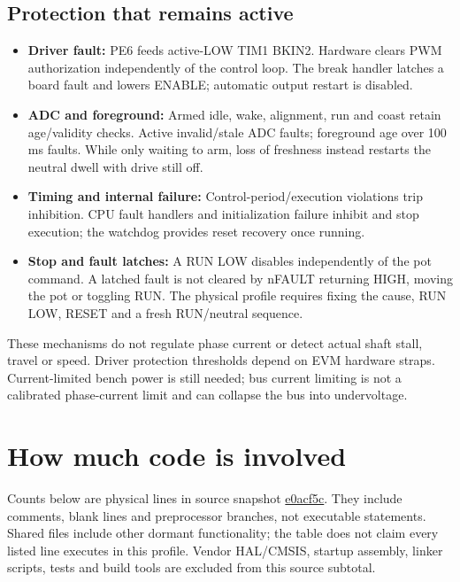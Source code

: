 \documentclass[11pt,letterpaper]{article}
\begin{document}
\subsection{Protection that remains active}

\begin{itemize}
\item \textbf{Driver fault:} PE6 feeds active-LOW TIM1 BKIN2. Hardware clears
PWM authorization independently of the control loop. The break handler latches
a board fault and lowers ENABLE; automatic output restart is disabled.
\item \textbf{ADC and foreground:} Armed idle, wake, alignment, run and coast
retain age/validity checks. Active invalid/stale ADC faults; foreground age
over 100 ms faults. While only waiting to arm, loss of freshness instead
restarts the neutral dwell with drive still off.
\item \textbf{Timing and internal failure:} Control-period/execution violations
trip inhibition. CPU fault handlers and initialization failure inhibit and
stop execution; the watchdog provides reset recovery once running.
\item \textbf{Stop and fault latches:} A RUN LOW disables independently of the
pot command. A latched fault is not cleared by nFAULT returning HIGH, moving
the pot or toggling RUN. The physical profile requires fixing the cause,
RUN LOW, RESET and a fresh RUN/neutral sequence.
\end{itemize}

These mechanisms do not regulate phase current or detect actual shaft stall,
travel or speed. Driver protection thresholds depend on EVM hardware straps.
Current-limited bench power is still needed; bus current limiting is not a
calibrated phase-current limit and can collapse the bus into undervoltage.

\section{How much code is involved}

Counts below are physical lines in source snapshot
\href{https://github.com/aaronhyzhang/lasertrackinggimbal-ece445/commit/e0acf5c962c5c35e43c126dc870b25a3903abaed}{e0acf5c}.
They include comments, blank lines and preprocessor branches, not executable
statements. Shared files include other dormant functionality; the table does
not claim every listed line executes in this profile. Vendor HAL/CMSIS,
startup assembly, linker scripts, tests and build tools are excluded from this
source subtotal.
\end{document}
